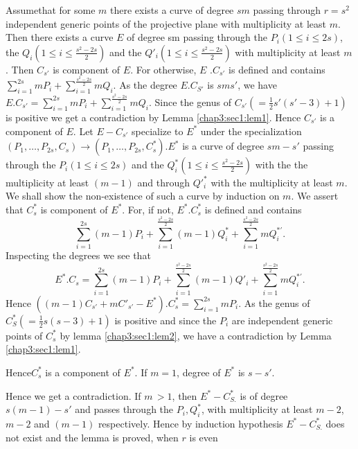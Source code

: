  Assume\pageoriginale that for some $m$ there exists a curve of degree
 $sm$ passing 
 through $r = s^{2} $ independent generic points of the projective
 plane with multiplicity at least $m$. Then there exists a curve $E$
 of degree sm passing through the $P_{i}(1 \leq i \leq 2s)$,  the 
 $Q_{i} (1 \leq i \leq \frac{s^{2}-2s}{2})$ and the $Q'_{i} (1 \leq
 i \leq \frac{s^{2}-2s}{2}) $ with multiplicity at least $m$. Then
 $C_{s'} $ is component of $E$. For otherwise, $E$ $. C_{s'} $ is 
 defined and contains $ \sum\limits^{2s}_{i=1} m P_{i} +
 \sum\limits^{\frac{s^{2}-2s}{2}}_{i = 1} m Q_{i}$. As the degree
 $E. C_{S'}$ is $sms'$, we have $E.C_{s'} =
 \sum\limits^{2s}_{i=1} m P_{i} + \sum\limits^{\frac{s^{2}-2s}{2}}_{i
  = 1} m Q_{i}$. Since the genus of $C_{s'} (= \frac{1}{2} s' (s' -
 3)+1) $ is positive we get a contradiction by Lemma
 \ref{chap3:sec1:lem1}. Hence $C_{s'} 
 $ is a component of $E$. Let $E - C_{s'}$  
 specialize to $E^{*} $ under the specialization $(P_{1}, \ldots ,
 P_{2s}, C_{s}) \rightarrow (P_{1}, \ldots , P_{2s}, C^{*}_{s}).E^{*}$
 is a curve of degree $sm - s'$ passing through  the $ P_{i} (1 \leq i 
 \leq 2s) $ and the $Q^{*}_{i}(1 \leq i \leq \frac{s^{2}-2s}{2}) $
 with the the multiplicity at least $(m-1)$ and through $Q'^{*}_{i}
 $ with the multiplicity at least $m$. We shall show the non-existence
 of such a curve by induction on $m$. We assert that $C^{*}_{s} $ is
 component of $E^{*}$. For, if not, $E^{*}. C^{*}_{s} $ is defined
 and contains 
 $$ 
 \sum\limits^{2s}_{i=1} (m -1) P_{i} + 
 \sum\limits^{\frac{s^2-2s}{2}}_{i=1} (m-1) Q^{*}_{i} +
 \sum\limits^{\frac{s^2 - 2s}{2}}_{i=1} m  Q^{*'}_{i}.
 $$ 
Inspecting the degrees we see that 
$$ 
E^{*} . C_{s} =
 \sum\limits^{2s}_{i=1} (m-1)P_{i}+
 \sum\limits^{\frac{s^{2}-2s}{2}}_{i=1} (m-1) Q'_{i} +
 \sum\limits^{\frac{s^{2}-2s}{2}}_{i=1} m Q^{*'}_{i}.
$$ 
  Hence $((m -1) C_{s'} + m C'_{s'} - E^{*}) . C^{*}_{s} =
 \sum\limits^{2s}_{i=1} m P_{i}$. As the genus of $C^{*}_{S}(=
 \frac{1}{2} s (s-3)+1)$ is positive and since the $P_{i}$ are
 independent generic points of $C^{*}_{s}$ by lemma
 \ref{chap3:sec1:lem2}, we have a  contradiction by Lemma \ref{chap3:sec1:lem1}.  
 
 Hence\pageoriginale $C^{*}_{s}$ is a component of $E^{*}$. If $m =
 1$, degree of $E^{*}$ is  $s-s'$. 

Hence we get a contradiction. If $m \, > 1$, then $E^{*}-
C^{*}_{S.}$ is of degree $s(m-1) -s'$ and passes through the $P_{i},
Q^{*}_{i}$, with multiplicity at least $m-2$, $m-2$ and $(m-1)$
respectively. Hence by induction hypothesis $E^{*}- C^{*}_{S.}$ does
not exist and the lemma is proved, when $r$ is even 


